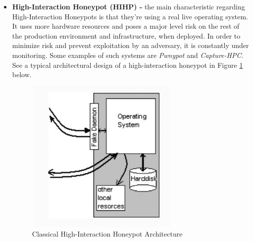 \documentclass[grad,lot,lof,11pt,oneside,onehalfspace]{RUthesis}
\begin{document}
\begin{itemize}
	\item\textbf{High-Interaction Honeypot (HIHP) -}
	the main characteristic regarding High-Interaction Honeypots is that they're using a real live operating system. It uses more hardware resources and poses a major level risk on the rest of the production environment and infrastructure, when deployed. In order to minimize risk and prevent exploitation by an adversary, it is constantly under monitoring. Some examples of such systems are \textit{Pwnypot} and \textit{Capture-HPC}.  See a typical architectural design of a high-interaction honeypot in Figure \ref{fig:HighInterHP} below. 
\begin{figure}[h]
\centering
\includegraphics[width=7.5cm, height=7.5cm]{"Images/Chapter 2/HighInterHP"}
\caption{Classical High-Interaction Honeypot Architecture}
\label{fig:HighInterHP}
\end{figure}
\end{itemize}
\end{document}
